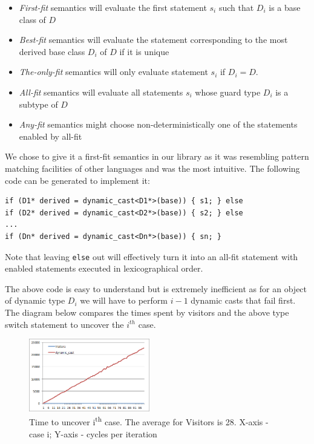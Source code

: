 \documentclass[preprint]{sigplanconf}
\makeatletter
\DeclareRobustCommand{\code}[1]{{\lstinline[breaklines=false,escapechar=@]{#1}}}
\makeatother
\begin{document}
\begin{itemize}
\item \emph{First-fit} semantics will evaluate the first statement $s_i$ such 
      that $D_i$ is a base class of $D$
\item \emph{Best-fit} semantics will evaluate the statement corresponding to the 
      most derived base class $D_i$ of $D$ if it is unique
\item \emph{The-only-fit} semantics will only evaluate statement $s_i$ if $D_i=D$.
\item \emph{All-fit} semantics will evaluate all statements $s_i$ whose guard 
      type $D_i$ is a subtype of $D$
\item \emph{Any-fit} semantics might choose non-deterministically one of the 
      statements enabled by all-fit
\end{itemize}

\noindent
We chose to give it a first-fit semantics in our library as it was resembling 
pattern matching facilities of other languages and was the most intuitive. The 
following code can be generated to implement it:

\begin{lstlisting}
if (D1* derived = dynamic_cast<D1*>(base)) { s1; } else
if (D2* derived = dynamic_cast<D2*>(base)) { s2; } else
...
if (Dn* derived = dynamic_cast<Dn*>(base)) { sn; }
\end{lstlisting}

\noindent
Note that leaving \code{else} out will effectively turn it into an all-fit 
statement with enabled statements executed in lexicographical order.

The above code is easy to understand but is extremely inefficient as for an 
object of dynamic type $D_i$ we will have to perform $i-1$ dynamic casts that 
fail first. The diagram below compares the times spent by visitors and the above 
type switch statement to uncover the $i^{th}$ case.

\begin{figure}[htbp]
  \centering
    \includegraphics[width=0.47\textwidth]{DCast-vs-Visitors.png}
  \caption{Time to uncover i\textsuperscript{th} case. The average for Visitors 
  is 28. X-axis - case i; Y-axis - cycles per iteration}
  \label{fig:DCastVis}
\end{figure}
\end{document}
